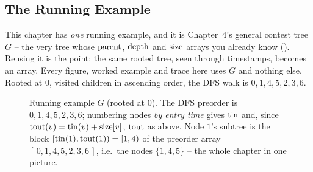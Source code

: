\subsection*{The Running Example}

This chapter has \emph{one} running example, and it is Chapter~4's general contest tree
$G$ -- the very tree whose $\operatorname{parent}$, $\operatorname{depth}$ and $\operatorname{size}$ arrays you already know
(). Reusing it is the point: the same rooted tree, seen through
timestamps, becomes an array. Every figure, worked example and trace here uses $G$ and
nothing else. Rooted at $0$, visited children in ascending order, the DFS walk is
$0, 1, 4, 5, 2, 3, 6$.

\begin{figure}[H]
\centering
{}
\caption{Running example $G$ (rooted at $0$). The DFS preorder is
$0,1,4,5,2,3,6$; numbering nodes \emph{by entry time} gives $\operatorname{tin}$ and, since
$\operatorname{tout}(v)=\operatorname{tin}(v)+\operatorname{size}[v]$, $\operatorname{tout}$ as above. Node $1$'s subtree is the block
$[\operatorname{tin}(1),\operatorname{tout}(1))=[1,4)$ of the preorder array $[\,0,1,4,5,2,3,6\,]$, i.e.\ the
nodes $\{1,4,5\}$ -- the whole chapter in one picture.}\label{fig:c24-running}
\end{figure}

